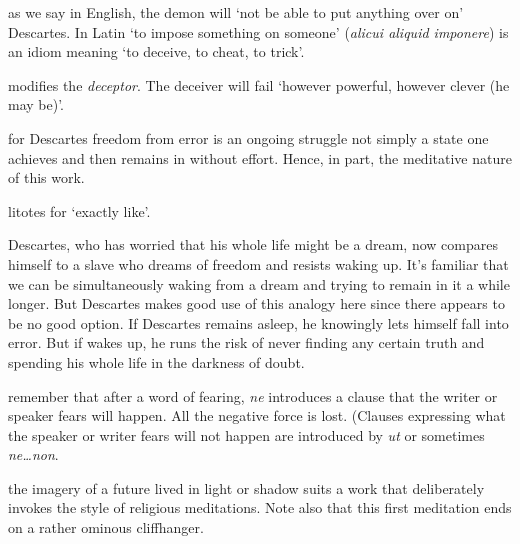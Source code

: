  as we say in English, the demon will `not be able to put anything over on' Descartes. In Latin `to impose something on someone' (\textit{alicui aliquid imponere}) is an idiom meaning `to deceive, to cheat, to trick'.

 modifies the \textit{deceptor}. The deceiver will fail `however powerful, however clever (he may be)'.

 for Descartes freedom from error is an ongoing struggle not simply a state one achieves and then remains in without effort. Hence, in part, the meditative nature of this work.

 litotes for `exactly like'.

 Descartes, who has worried that his whole life might be a dream, now compares himself to a slave who dreams of freedom and resists waking up. It's familiar that we can be simultaneously waking from a dream and trying to remain in it a while longer. But Descartes makes good use of this analogy here since there appears to be no good option. If Descartes remains asleep, he knowingly lets himself fall into error. But if wakes up, he runs the risk of never finding any certain truth and spending his whole life in the darkness of doubt.

 remember that after a word of fearing, \textit{ne} introduces a clause that the writer or speaker fears will happen. All the negative force is lost. (Clauses expressing what the speaker or writer fears will not happen are introduced by \textit{ut} or sometimes \textit{ne\dots non}.

 the imagery of a future lived in light or shadow suits a work that deliberately invokes the style of religious meditations. Note also that this first meditation ends on a rather ominous cliffhanger.

